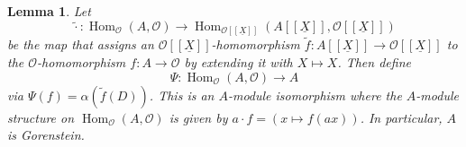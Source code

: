 \documentclass{article}
\theoremstyle{plain}%
\newtheorem{lemma}[theorem]{Lemma}
\theoremstyle{definition}
\theoremstyle{remark}
\renewcommand{\hom}{\operatorname{Hom}}
\begin{document}
\begin{lemma}\textup{\cite[lemma 5.15]{Darmon1995}}\label{lem:gorenstein}
    Let 
    \[
        \!\tilde{\cdot}\colon \hom_\mathcal{O}(A, \mathcal{O}) \to 
        \hom_{\mathcal{O}[[\underline{X}]]}(A[[\underline{X}]], \mathcal{O}[[\underline{X}]])
    \]
    be the map that assigns an \(\mathcal{O}[[\underline{X}]]\)-homomorphism
    \(\tilde f\colon A[[\underline{X}]] \to \mathcal{O}[[\underline{X}]]\) to the \(\mathcal{O}\)-homomorphism
    \(f \colon A \to \mathcal{O}\) by extending it with \(X \mapsto X\).
    Then define
    \[
        \Psi \colon \hom_\mathcal{O}(A, \mathcal{O}) \to A  
    \]
    via \(\Psi(f) = \alpha(\tilde{f}(D))\).
    This is an \(A\)-module isomorphism where the \(A\)-module structure on \(\hom_\mathcal{O}(A, \mathcal{O})\)
    is given by \(a \cdot f = (x \mapsto f(ax))\).
    In particular, \(A\) is Gorenstein.
\end{lemma}
\end{document}
